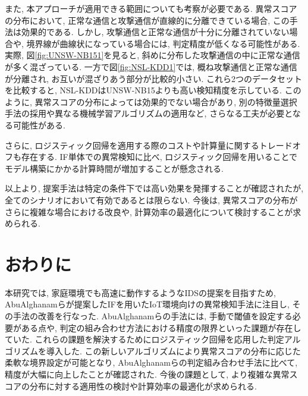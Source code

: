 \documentclass{css}
\begin{document}
また, 本アプローチが適用できる範囲についても考察が必要である. 異常スコアの分布において, 正常な通信と攻撃通信が直線的に分離できている場合, この手法は効果的である. しかし, 攻撃通信と正常な通信が十分に分離されていない場合や, 境界線が曲線状になっている場合には, 判定精度が低くなる可能性がある. 実際, 図\ref{fig:UNSW-NB151}を見ると, 斜めに分布した攻撃通信の中に正常な通信が多く混ざっている. 一方で図\ref{fig:NSL-KDD1}では, 概ね攻撃通信と正常な通信が分離され, お互いが混ざりあう部分が比較的小さい. これら2つのデータセットを比較すると, NSL-KDDはUNSW-NB15よりも高い検知精度を示している. このように, 異常スコアの分布によっては効果的でない場合があり, 別の特徴量選択手法の採用や異なる機械学習アルゴリズムの適用など, さらなる工夫が必要となる可能性がある. 

さらに, ロジスティック回帰を適用する際のコストや計算量に関するトレードオフも存在する. IF単体での異常検知に比べ, ロジスティック回帰を用いることでモデル構築にかかる計算時間が増加することが懸念される. 

以上より, 提案手法は特定の条件下では高い効果を発揮することが確認されたが, 全てのシナリオにおいて有効であるとは限らない. 今後は, 異常スコアの分布がさらに複雑な場合における改良や, 計算効率の最適化について検討することが求められる. 

\section{おわりに}
本研究では, 家庭環境でも高速に動作するようなIDSの提案を目指すため, AbuAlghanamらが提案したIFを用いたIoT環境向けの異常検知手法\cite{AbuAlghanam2023-sx}に注目し, その手法の改善を行なった. AbuAlghanamらの手法には, 手動で閾値を設定する必要がある点や, 判定の組み合わせ方法における精度の限界といった課題が存在していた. これらの課題を解決するためにロジスティック回帰を応用した判定アルゴリズムを導入した. この新しいアルゴリズムにより異常スコアの分布に応じた柔軟な境界設定が可能となり, AbuAlghanamらの判定組み合わせ手法に比べて, 精度が大幅に向上したことが確認された. 今後の課題として, より複雑な異常スコアの分布に対する適用性の検討や計算効率の最適化が求められる. 


\end{document}
